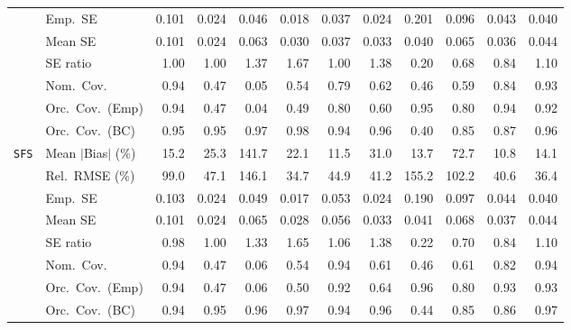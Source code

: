 \begin{landscape}
\begin{longtable}{llrrrrrrrrrr}
 & Emp.\ SE & 0.101 & 0.024 & 0.046 & 0.018 & 0.037 & 0.024 & 0.201 & 0.096 & 0.043 & 0.040 \\
 & Mean SE & 0.101 & 0.024 & 0.063 & 0.030 & 0.037 & 0.033 & 0.040 & 0.065 & 0.036 & 0.044 \\
 & SE ratio & \cellcolor{rankone}1.00 & \cellcolor{rankone}1.00 & 1.37 & 1.67 & \cellcolor{rankone}1.00 & 1.38 & 0.20 & 0.68 & \cellcolor{rankthree}0.84 & \cellcolor{ranktwo}1.10 \\
 & Nom.\ Cov. & \cellcolor{rankone}0.94 & 0.47 & 0.05 & 0.54 & 0.79 & 0.62 & 0.46 & 0.59 & \cellcolor{rankthree}0.84 & \cellcolor{ranktwo}0.93 \\
 & Orc.\ Cov.\ (Emp) & \cellcolor{ranktwo}0.94 & 0.47 & 0.04 & 0.49 & 0.80 & 0.60 & \cellcolor{rankone}0.95 & 0.80 & \cellcolor{ranktwo}0.94 & \cellcolor{rankthree}0.92 \\
 & Orc.\ Cov.\ (BC) & \cellcolor{rankone}0.95 & \cellcolor{rankone}0.95 & \cellcolor{rankthree}0.97 & 0.98 & \cellcolor{ranktwo}0.94 & \cellcolor{ranktwo}0.96 & 0.40 & 0.85 & 0.87 & \cellcolor{ranktwo}0.96 \\
\addlinespace[2pt]
\quad \texttt{SFS} & Mean $|$Bias$|$ (\%) & 15.2 & 25.3 & 141.7 & 22.1 & \cellcolor{ranktwo}11.5 & 31.0 & \cellcolor{rankthree}13.7 & 72.7 & \cellcolor{rankone}10.8 & 14.1 \\
 & Rel.\ RMSE (\%) & 99.0 & 47.1 & 146.1 & \cellcolor{rankone}34.7 & 44.9 & 41.2 & 155.2 & 102.2 & \cellcolor{rankthree}40.6 & \cellcolor{ranktwo}36.4 \\
 & Emp.\ SE & 0.103 & 0.024 & 0.049 & 0.017 & 0.053 & 0.024 & 0.190 & 0.097 & 0.044 & 0.040 \\
 & Mean SE & 0.101 & 0.024 & 0.065 & 0.028 & 0.056 & 0.033 & 0.041 & 0.068 & 0.037 & 0.044 \\
 & SE ratio & \cellcolor{ranktwo}0.98 & \cellcolor{rankone}1.00 & 1.33 & 1.65 & \cellcolor{rankthree}1.06 & 1.38 & 0.22 & 0.70 & 0.84 & 1.10 \\
 & Nom.\ Cov. & \cellcolor{rankone}0.94 & 0.47 & 0.06 & 0.54 & \cellcolor{rankone}0.94 & \cellcolor{rankthree}0.61 & 0.46 & \cellcolor{rankthree}0.61 & \cellcolor{ranktwo}0.82 & \cellcolor{rankone}0.94 \\
 & Orc.\ Cov.\ (Emp) & \cellcolor{rankone}0.94 & 0.47 & 0.06 & 0.50 & \cellcolor{rankthree}0.92 & 0.64 & \cellcolor{rankone}0.96 & 0.80 & \cellcolor{ranktwo}0.93 & \cellcolor{ranktwo}0.93 \\
 & Orc.\ Cov.\ (BC) & \cellcolor{ranktwo}0.94 & \cellcolor{rankone}0.95 & \cellcolor{ranktwo}0.96 & \cellcolor{rankthree}0.97 & \cellcolor{ranktwo}0.94 & \cellcolor{ranktwo}0.96 & 0.44 & 0.85 & 0.86 & \cellcolor{rankthree}0.97 \\

\end{longtable}
\end{landscape}
